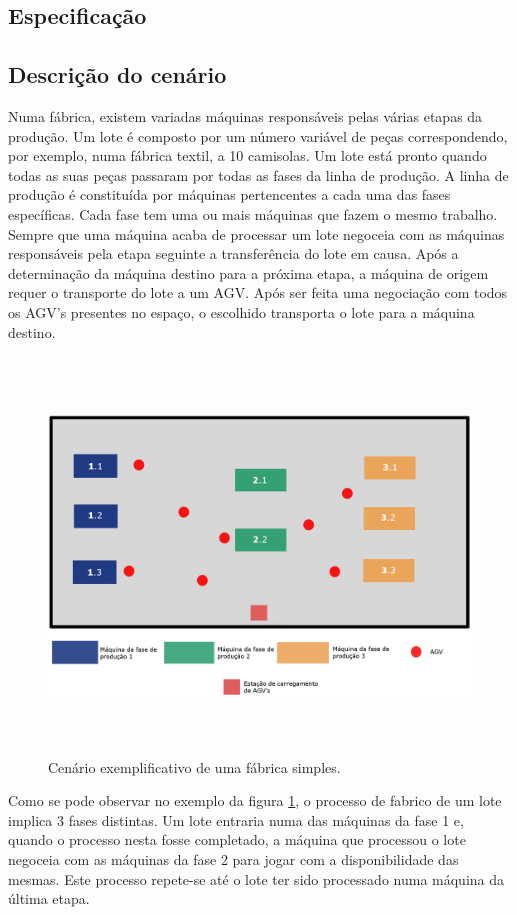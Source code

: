 \begin{titlepage}
\section{Especificação}

\subsection{Descrição do cenário}
Numa fábrica, existem variadas máquinas responsáveis pelas várias etapas da produção. Um lote é composto por um número variável de peças correspondendo, por exemplo, numa fábrica textil, a 10 camisolas. Um lote está pronto quando todas as suas peças passaram por todas as fases da linha de produção. A linha de produção é constituída por máquinas pertencentes a cada uma das fases específicas. Cada fase tem uma ou mais máquinas que fazem o mesmo trabalho. Sempre que uma máquina acaba de processar um lote negoceia com as máquinas responsáveis pela etapa seguinte a transferência do lote em causa. Após a determinação da máquina destino para a próxima etapa, a máquina de origem requer o transporte do lote a um AGV. Após ser feita uma negociação com todos os AGV's presentes no espaço, o escolhido transporta o lote para a máquina destino.

\begin{figure}[H]
  \centering
    \includegraphics[width=18cm, height = 10.5cm]{scenario.png}
  \caption{Cenário exemplificativo de uma fábrica simples.}
  \label{scenario}
\end{figure}

Como se pode observar no exemplo da figura \ref{scenario}, o processo de fabrico de um lote implica 3 fases distintas. Um lote entraria numa das máquinas da fase 1 e, quando o processo nesta fosse completado, a máquina que processou o lote negoceia com as máquinas da fase 2 para jogar com a disponibilidade das mesmas. Este processo repete-se até o lote ter sido processado numa máquina da última etapa. 


\end{titlepage}

